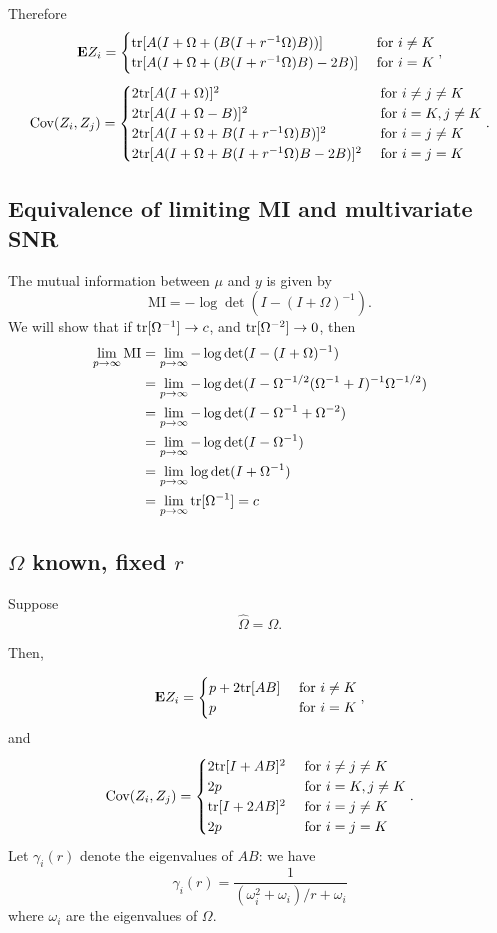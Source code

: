 \documentclass[12pt]{article}
\begin{document}
Therefore
\[
\textbf{E} Z_i = \begin{cases}
\text{tr}[A (I + \Omega + (B(I + r^{-1}\Omega) B))] & \text{ for }i \neq K\\
\text{tr}[A (I + \Omega + (B(I + r^{-1}\Omega) B) - 2B)] & \text{ for }i = K
\end{cases},
\]
\[
\text{Cov}(Z_i, Z_j) = 
\begin{cases}
2\text{tr}[A (I + \Omega)]^2 & \text{ for }i \neq j \neq K\\
2\text{tr}[A (I + \Omega - B)]^2 & \text{ for }i =K, j \neq K\\
2\text{tr}[A (I + \Omega + B(I + r^{-1}\Omega) B)]^2 & \text{ for }i=j \neq K\\
2\text{tr}[A (I + \Omega + B(I + r^{-1}\Omega) B - 2B)]^2 & \text{ for }i=j=K
\end{cases}.
\]

\subsection{Equivalence of limiting MI and multivariate SNR}

The mutual information between $\mu$ and $y$ is given by
\[
\text{MI} = -\log\det(I - (I+ \Omega)^{-1}).
\]
We will show that if $\text{tr}[\Omega^{-1}] \to c$, and
$\text{tr}[\Omega^{-2}] \to 0$, then 
\begin{align*}
\lim_{p \to \infty} \text{MI} &= \lim_{p \to \infty} -\log\det(I - (I+ \Omega)^{-1})
\\&= \lim_{p \to \infty} -\log\det(I - \Omega^{-1/2} (\Omega^{-1}+ I)^{-1} \Omega^{-1/2})
\\&= \lim_{p \to \infty} -\log\det(I - \Omega^{-1} + \Omega^{-2})
\\&= \lim_{p \to \infty} -\log\det(I - \Omega^{-1})
\\&= \lim_{p \to \infty} \log\det(I + \Omega^{-1})
\\&= \lim_{p \to \infty} \text{tr}[\Omega^{-1}] = c
\end{align*}

\subsection{$\Omega$ known, fixed $r$}

Suppose
\[
\hat{\Omega} = \Omega.
\]

Then,


\[
\textbf{E} Z_i = \begin{cases}
p + 2\text{tr}[AB] & \text{ for }i \neq K\\
p & \text{ for }i = K
\end{cases},
\]
and
\[
\text{Cov}(Z_i, Z_j) = 
\begin{cases}
2\text{tr}[I + AB]^2 & \text{ for }i \neq j \neq K\\
2p & \text{ for }i =K, j \neq K\\
\text{tr}[I + 2AB]^2 & \text{ for }i=j \neq K\\
2p & \text{ for }i=j=K
\end{cases}.
\]
Let $\gamma_i(r)$ denote the eigenvalues of $AB$: we have
\[
\gamma_i(r) = \frac{1}{(\omega_i^2 + \omega_i)/r + \omega_i}
\]
where $\omega_i$ are the eigenvalues of $\Omega$.
\end{document}
